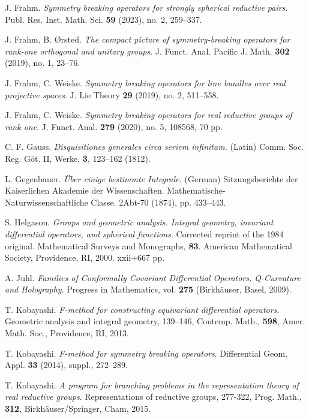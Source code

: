\documentclass[12pt, pdflatex, a4paper]{article}
\theoremstyle{plain}
\theoremstyle{definition}
\begin{document}
\begin{thebibliography}{}
J. Frahm.
\textit{Symmetry breaking operators for strongly spherical reductive pairs}. 
Publ. Res. Inst. Math. Sci. \textbf{59} (2023), no. 2, 259–337.

J. Frahm, B. \O rsted.
\textit{The compact picture of symmetry-breaking operators for rank-one orthogonal and unitary groups}. J. Funct. Anal. Pacific J. Math. \textbf{302} (2019), no. 1, 23–76.

J. Frahm, C. Weiske.
\textit{Symmetry breaking operators for line bundles over real projective spaces}. 
J. Lie Theory \textbf{29} (2019), no. 2, 511–558.

J. Frahm, C. Weiske.
\textit{Symmetry breaking operators for real reductive groups of rank one}. J. Funct. Anal. \textbf{279} (2020), no. 5, 108568, 70 pp.

C. F. Gauss.
\textit{Disquisitiones generales circa seriem infinitam.} (Latin) Comm. Soc. Reg. Göt. II, Werke, \textbf{3}, 123--162 (1812).

L. Gegenbauer.
\textit{Über einige bestimmte Integrale.} (German)
Sitzungsberichte der Kaiserlichen Akademie der Wissenschaften. Mathematische-Naturwissenschaftliche Classe. 2Abt-70 (1874), pp. 433--443. 

S. Helgason.
\textit{Groups and geometric analysis. Integral geometry, invariant differential operators, and spherical functions}.
Corrected reprint of the 1984 original. Mathematical Surveys and Monographs, \textbf{83}. American Mathematical Society, Providence, RI, 2000. xxii+667 pp.

A. Juhl.
\textit{Families of Conformally Covariant Differential Operators, Q-Curvature and Holography}.
Progress in Mathematics, vol. \textbf{275} (Birkhäuser, Basel, 2009).

T. Kobayashi.
\textit{F-method for constructing equivariant differential operators}.
Geometric analysis and integral geometry, 139--146, Contemp. Math., \textbf{598}, Amer. Math. Soc., Providence, RI, 2013.

T. Kobayashi.
\textit{F-method for symmetry breaking operators}.
Differential Geom. Appl. \textbf{33} (2014), suppl., 272--289.

T. Kobayashi.
\textit{A program for branching problems in the representation theory of real reductive groups}.
Representations of reductive groups, 277-322, Prog. Math., \textbf{312}, Birkhäuser/Springer, Cham, 2015.


\end{thebibliography}
\end{document}
